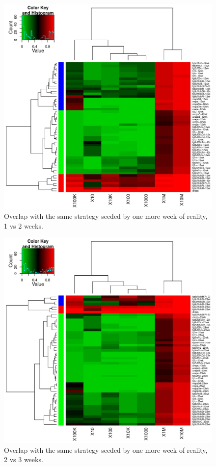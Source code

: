 \documentclass[10pt,oneside]{memoir}
\begin{document}
\begin{Spacing}{2}
\begin{figure}
\begin{center}
    \includegraphics{figures/crop/heatmap-overx-self-medians-1wk}
    \caption{Overlap with the same strategy seeded by one more week of reality, 1 vs 2 weeks.}
    \label{figure:heatmap-overx-self-medians-1wk}
\end{center}
\end{figure}

\begin{figure}
\begin{center}
    \includegraphics{figures/crop/heatmap-overx-self-medians-2wk}
    \caption{Overlap with the same strategy seeded by one more week of reality, 2 vs 3 weeks.}
    \label{figure:heatmap-overx-self-medians-2wk}
\end{center}
\end{figure}


\end{Spacing}
\end{document}
